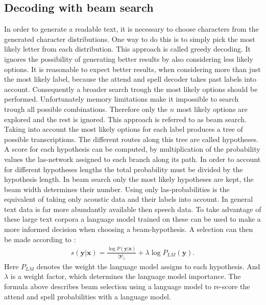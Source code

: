 \subsection{Decoding with beam search}
\label{sec:beamsearch}
In order to generate a readable text, it is necessary to choose characters from the generated character distributions. One way to do this is to simply pick the most likely letter from each distribution. This approach is called greedy decoding. It ignores the possibility of generating better results by also considering less likely options. It is reasonable to expect better results, when considering more than just the most likely label, because the attend and spell decoder takes past labels into account. Consequently a broader search trough the most likely options should be performed. Unfortunately memory limitations make it impossible to search trough all possible combinations. Therefore only the $n$ most likely options are explored and the rest is ignored. This approach is referred to as beam search. Taking into account the most likely options for each label produces a tree of possible transcriptions. The different routes along this tree are called hypotheses. A score for each hypothesis can be computed, by multiplication of the probability values the las-network assigned to each branch along its path. In order to account for different hypotheses lengths the total probability must be divided by the hypothesis length. In beam search only the most likely hypotheses are kept, the beam width determines their number. Using only las-probabilities is the equivalent of taking only acoustic data and their labels into account. In general text data is far more abundantly available then speech data. To take advantage of these large text corpora a language model trained on these can be used to make a more informed decision when choosing a beam-hypothesis. A selection can then be made according to \cite[page 6]{Chan2015}:
\begin{align}
s(\mathbf{y}|\mathbf{x}) = \frac{\log P(\mathbf{y}|\mathbf{x})}{ |\mathbf{y}|_c} + \lambda \log P_{LM}(\mathbf{y}).
\end{align}
Here $P_{LM}$ denotes the weight the language model assigns to each hypothesis. And $\lambda$ is a weight factor, which determines the language model importance. The formula above describes beam selection using a language model to re-score the attend and spell probabilities with a language model.

